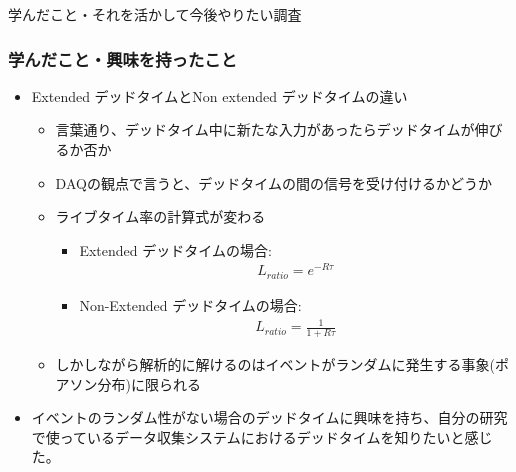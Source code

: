 \documentclass[12pt,a4paper,upLaTeX]{jsarticle}
\begin{document}
\fancyhf{}
\setlength{\headheight}{60pt}   %

\setlength{\footskip}{20pt}

\fancyfoot[R]{\thepage}

\vspace{50pt}
\begin{center}
{\gt \Large 学んだこと・それを活かして今後やりたい調査 }\\[14pt]

\end{center}

\vspace{10pt}

\subsubsection*{学んだこと・興味を持ったこと}
\begin{itemize}
  \item Extended デッドタイムとNon extended デッドタイムの違い
  \begin{itemize}
    \item 言葉通り、デッドタイム中に新たな入力があったらデッドタイムが伸びるか否か
    \item DAQの観点で言うと、デッドタイムの間の信号を受け付けるかどうか
    \item ライブタイム率の計算式が変わる
    \begin{itemize}
      \item Extended デッドタイムの場合:
      \begin{align}
        L_{ratio} = e^{-R\tau}
      \end{align}
      \item Non-Extended デッドタイムの場合:
      \begin{align}
        L_{ratio} = \frac{1}{1+R\tau}
      \end{align}
    \end{itemize}
    \item しかしながら解析的に解けるのはイベントがランダムに発生する事象(ポアソン分布)に限られる
  \end{itemize}
  \item イベントのランダム性がない場合のデッドタイムに興味を持ち、自分の研究で使っているデータ収集システムにおけるデッドタイムを知りたいと感じた。
\end{itemize}
\end{document}
